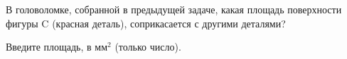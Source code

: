 
В головоломке, собранной в предыдущей задаче, какая площадь поверхности фигуры C (красная деталь), 
соприкасается с другими деталями?


Введите площадь,  в мм$^2$  (только число).


